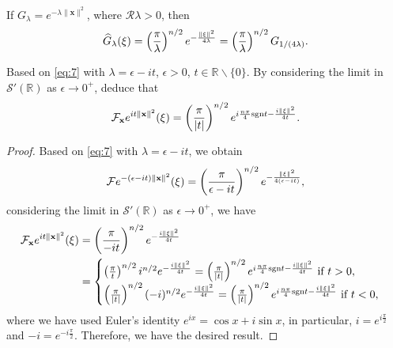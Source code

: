 \begin{lem}
  If $G_{\lambda}=e^{-\lambda\|\mathbf{x}\|^2}$,
  where $\mathscr{R}\lambda>0$,
  then
  \begin{equation}
    \label{eq:7}
    \widehat{G}_{\lambda}(\xi) = \left( \frac{\pi}{\lambda}\right)^{n/2}
    e^{-\frac{\|\xi\|^2}{4\lambda}} = \left( \frac{\pi}{\lambda}\right)^{n/2}
    G_{1/(4\lambda)}.
  \end{equation}
\end{lem}

\begin{pro}
  Based on \eqref{eq:7} with $\lambda=\epsilon-it$,
  $\epsilon>0$,
  $t\in\mathbb{R}\backslash\{0\}$.
  By considering the limit in $\mathcal{S}'(\mathbb{R})$
  as $\epsilon\to 0^+$, deduce that
  \begin{equation}
    \mathcal{F}_{\mathbf{x}}e^{it\|\mathbf{x}\|^2}(\xi) =
    \left( \frac{\pi}{|t|}\right)^{n/2}e^{i \frac{n\pi}{4}\mathrm{sgn}t
    -\frac{i\|\xi\|^2}{4t}}.
  \end{equation}
\end{pro}

\begin{proof}
  Based on \eqref{eq:7} with $\lambda=\epsilon-it$,
  we obtain
  \begin{displaymath}
    \mathcal{F}e^{-(\epsilon-it)\|\mathbf{x}\|^2}(\xi) = \left( \frac{\pi}{\epsilon-it}\right)^{n/2}e^{-\frac{\|\xi\|^2}{4(\epsilon-it)}},
  \end{displaymath}
  considering the limit in $\mathcal{S}'(\mathbb{R})$ as $\epsilon\to 0^+$,
  we have
  \begin{align*}
    \mathcal{F}_{\mathbf{x}}e^{it\|\mathbf{x}\|^2}(\xi) &= \left( \frac{\pi}{-it}\right)^{n/2}e^{-\frac{i\|\xi\|^2}{4t}} \\
    &=
      \begin{cases}
        \left( \frac{\pi}{t}\right)^{n/2}i^{n/2}e^{-\frac{i\|\xi\|^2}{4t}} =
        \left( \frac{\pi}{|t|}\right)^{n/2}e^{i \frac{n\pi}{4}\mathrm{sgn}t-\frac{i\|\xi\|^2}{4t}} \text{ if } t>0, \\
        \left( \frac{\pi}{|t|}\right)^{n/2}(-i)^{n/2}e^{-\frac{i\|\xi\|^2}{4t}} =
        \left( \frac{\pi}{|t|}\right)^{n/2}e^{i \frac{n\pi}{4}\mathrm{sgn}t-\frac{i\|\xi\|^2}{4t}} \text{ if } t<0,
      \end{cases}
  \end{align*}
  where we have used Euler's identity $e^{ix}=\cos x+i\sin x$,
  in particular, $i = e^{i \frac{\pi}{2}}$ and $-i=e^{-i \frac{\pi}{2}}$.
  Therefore, we have the desired result.
\end{proof}
